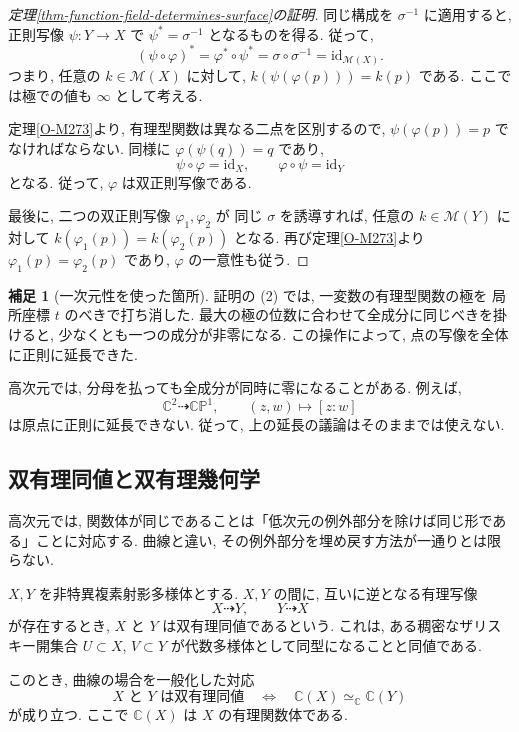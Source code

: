 \documentclass[dvipdfmx,a4paper,11pt]{article} %
\newcommand{\C}{\mathbb{C}}
\theoremstyle{definition}
\numberwithin{equation}{section}
\newtheorem{rem}[thm]{補足}
\begin{document}
\begin{proof}[定理\ref{thm-function-field-determines-surface}の証明]
同じ構成を $\sigma^{-1}$ に適用すると,
正則写像 $\psi:Y\to X$ で $\psi^*=\sigma^{-1}$ となるものを得る.
従って,
\[
(\psi\circ\varphi)^*
=\varphi^*\circ\psi^*
=\sigma\circ\sigma^{-1}
=\mathrm{id}_{\mathcal M(X)}.
\]
つまり, 任意の $k\in\mathcal M(X)$ に対して,
$k(\psi(\varphi(p)))=k(p)$ である.
ここでは極での値も $\infty$ として考える.

定理\ref{O-M273}より, 有理型関数は異なる二点を区別するので,
$\psi(\varphi(p))=p$ でなければならない.
同様に $\varphi(\psi(q))=q$ であり,
\[
\psi\circ\varphi=\mathrm{id}_X,\qquad
\varphi\circ\psi=\mathrm{id}_Y
\]
となる.
従って, $\varphi$ は双正則写像である.

最後に, 二つの双正則写像 $\varphi_1,\varphi_2$ が
同じ $\sigma$ を誘導すれば,
任意の $k\in\mathcal M(Y)$ に対して
$k(\varphi_1(p))=k(\varphi_2(p))$ となる.
再び定理\ref{O-M273}より $\varphi_1(p)=\varphi_2(p)$ であり,
$\varphi$ の一意性も従う.
\end{proof}

\begin{rem}[一次元性を使った箇所]
証明の (2) では, 一変数の有理型関数の極を
局所座標 $t$ のべきで打ち消した.
最大の極の位数に合わせて全成分に同じべきを掛けると,
少なくとも一つの成分が非零になる.
この操作によって, 点の写像を全体に正則に延長できた.

高次元では, 分母を払っても全成分が同時に零になることがある.
例えば,
\[
\C^2\dashrightarrow\C\mathbb P^1,\qquad
(z,w)\longmapsto[z:w]
\]
は原点に正則に延長できない.
従って, 上の延長の議論はそのままでは使えない.
\end{rem}



\subsection{双有理同値と双有理幾何学}


高次元では, 関数体が同じであることは「低次元の例外部分を除けば同じ形である」ことに対応する. 曲線と違い, その例外部分を埋め戻す方法が一通りとは限らない.

$X,Y$ を非特異複素射影多様体とする.
$X,Y$ の間に, 互いに逆となる有理写像
\[
X\dashrightarrow Y,\qquad Y\dashrightarrow X
\]
が存在するとき, $X$ と $Y$ は双有理同値であるという.
これは, ある稠密なザリスキー開集合
$U\subset X$, $V\subset Y$ が代数多様体として同型になることと同値である.

このとき, 曲線の場合を一般化した対応
\[
X\text{ と }Y\text{ は双有理同値}
\quad\Longleftrightarrow\quad
\mathbb C(X)\simeq_{\mathbb C}\mathbb C(Y)
\]
が成り立つ.
ここで $\mathbb C(X)$ は $X$ の有理関数体である.
\end{document}
